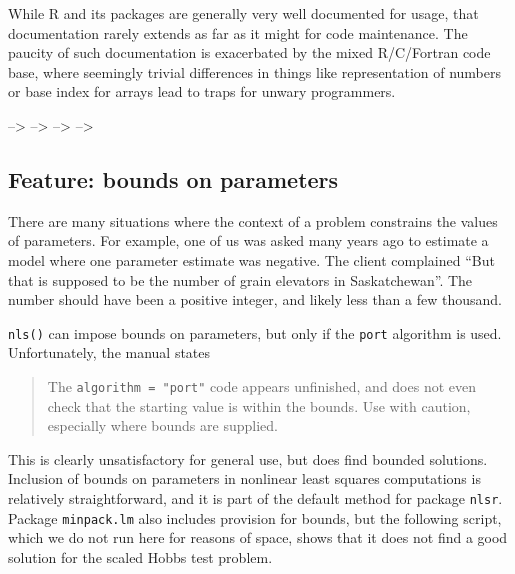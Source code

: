 \documentclass[
]{article}
\begin{document}
While R and its packages are generally very well documented for usage,
that documentation rarely extends as far as it might for code
maintenance. The paucity of such documentation is exacerbated by the
mixed R/C/Fortran code base, where seemingly trivial differences in
things like representation of numbers or base index for arrays lead to
traps for unwary programmers.

--\textgreater{} --\textgreater{} --\textgreater{} --\textgreater{}

\hypertarget{feature-bounds-on-parameters}{%
\subsection{Feature: bounds on
parameters}\label{feature-bounds-on-parameters}}

There are many situations where the context of a problem constrains the
values of parameters. For example, one of us was asked many years ago to
estimate a model where one parameter estimate was negative. The client
complained ``But that is supposed to be the number of grain elevators in
Saskatchewan''. The number should have been a positive integer, and
likely less than a few thousand.

\texttt{nls()} can impose bounds on parameters, but only if the
\texttt{port} algorithm is used. Unfortunately, the manual states

\begin{quote}
The \texttt{algorithm\ =\ "port"} code appears unfinished, and does not
even check that the starting value is within the bounds. Use with
caution, especially where bounds are supplied.
\end{quote}

This is clearly unsatisfactory for general use, but does find bounded
solutions. Inclusion of bounds on parameters in nonlinear least squares
computations is relatively straightforward, and it is part of the
default method for package \texttt{nlsr}. Package \texttt{minpack.lm}
also includes provision for bounds, but the following script, which we
do not run here for reasons of space, shows that it does not find a good
solution for the scaled Hobbs test problem.
\end{document}
